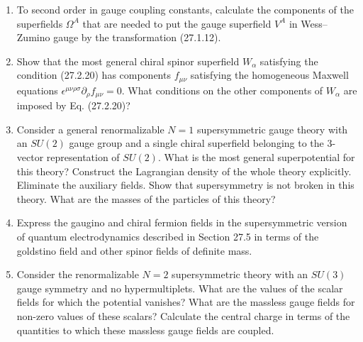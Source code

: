 

\begin{enumerate}
  \item To second order in gauge coupling constants, calculate the
  components of the superfields $\Omega^A$ that are needed to put the
  gauge superfield $V^A$ in Wess--Zumino gauge by the transformation
  (27.1.12).

  \item Show that the most general chiral spinor superfield $W_\alpha$
  satisfying the condition (27.2.20) has components $f_{\mu\nu}$
  satisfying the homogeneous Maxwell equations
  $\epsilon^{\mu\nu\rho\sigma}\partial_\rho f_{\mu\nu}=0$. What
  conditions on the other components of $W_\alpha$ are imposed by
  Eq. (27.2.20)?

  \item Consider a general renormalizable $N=1$ supersymmetric gauge
  theory with an $SU(2)$ gauge group and a single chiral superfield
  belonging to the 3-vector representation of $SU(2)$. What is the most
  general superpotential for this theory? Construct the Lagrangian
  density of the whole theory explicitly. Eliminate the auxiliary
  fields. Show that supersymmetry is not broken in this theory. What are
  the masses of the particles of this theory?

  \item Express the gaugino and chiral fermion fields in the
  supersymmetric version of quantum electrodynamics described in
  Section 27.5 in terms of the goldstino field and other spinor fields
  of definite mass.

  \item Consider the renormalizable $N=2$ supersymmetric theory with an
  $SU(3)$ gauge symmetry and no hypermultiplets. What are the values of
  the scalar fields for which the potential vanishes? What are the
  massless gauge fields for non-zero values of these scalars? Calculate
  the central charge in terms of the quantities to which these massless
  gauge fields are coupled.
\end{enumerate}


